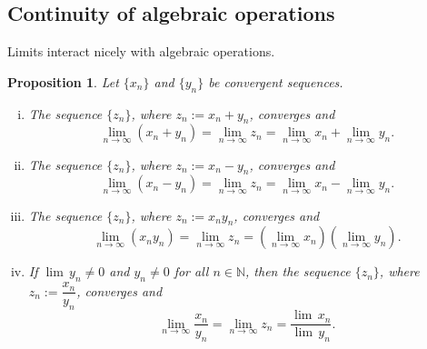 \documentclass[12pt]{book}
\newcommand{\N}{{\mathbb{N}}}
\theoremstyle{plain}
\newtheorem{prop}[thm]{Proposition}
\theoremstyle{remark}
\theoremstyle{definition}
\theoremstyle{exercise}
\theoremstyle{example}
\begin{document}
\subsection{Continuity of algebraic operations}

Limits interact nicely with algebraic operations.

\begin{prop} \label{prop:contalg}
Let $\{ x_n \}$ and $\{ y_n \}$ be convergent sequences.
\begin{enumerate}[(i)]
\item \label{prop:contalg:i}
The sequence $\{ z_n \}$, where $z_n := x_n + y_n$, converges and
\begin{equation*}
\lim_{n \to \infty} (x_n + y_n) = 
\lim_{n \to \infty} z_n = 
\lim_{n \to \infty} x_n + 
\lim_{n \to \infty} y_n .
\end{equation*}
\item \label{prop:contalg:ii}
The sequence $\{ z_n \}$, where $z_n := x_n - y_n$, converges and
\begin{equation*}
\lim_{n \to \infty} (x_n - y_n) = 
\lim_{n \to \infty} z_n = 
\lim_{n \to \infty} x_n - 
\lim_{n \to \infty} y_n .
\end{equation*}
\item \label{prop:contalg:iii}
The sequence $\{ z_n \}$, where $z_n := x_n y_n$, converges and
\begin{equation*}
\lim_{n \to \infty} (x_n y_n) = 
\lim_{n \to \infty} z_n = 
\left( \lim_{n \to \infty} x_n \right)
\left( \lim_{n \to \infty} y_n \right) .
\end{equation*}
\item \label{prop:contalg:iv}
If $\lim\, y_n \not= 0$ and $y_n \not= 0$ for all $n \in \N$, then
the sequence $\{ z_n \}$, where $z_n := \dfrac{x_n}{y_n}$, converges and
\begin{equation*}
\lim_{n \to \infty} \frac{x_n}{y_n} = 
\lim_{n \to \infty} z_n = 
\frac{\lim\, x_n}{\lim\, y_n} .
\end{equation*}
\end{enumerate}
\end{prop}
\end{document}
